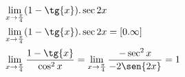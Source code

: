 \begin{ex}
\begin{align}
&\lim_{x\rightarrow \frac{\pi}{4}} (1-\tg{x}).\sec{2x}\nonumber\\
&\lim_{x\rightarrow \frac{\pi}{4}} (1-\tg{x}).\sec{2x}=[0.\infty]\nonumber\\
&\lim_{x\rightarrow \frac{\pi}{4}} \frac{1-\tg{x}}{\cos^2{x}}=\lim_{x\rightarrow \frac{\pi}{4}} \frac{-\sec^2{x}}{-2\sen{2x}}=1\nonumber
\end{align}
\end{ex}

